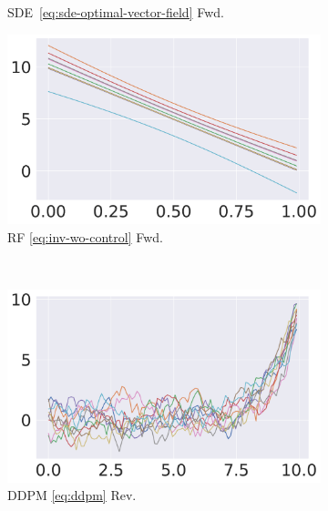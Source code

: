 \documentclass{article} %
\theoremstyle{plain}
\begin{document}
\begin{figure}[!tbh]
\begin{subfigure}[b]{0.24\columnwidth}
        \caption{SDE~\eqref{eq:sde-optimal-vector-field} Fwd.}
     \end{subfigure}
     \begin{subfigure}[b]{0.24\columnwidth}
         \centering
         \includegraphics[width=\linewidth]{pics/rf-fwd.pdf}
        \caption{RF \eqref{eq:inv-wo-control} Fwd.}
     \end{subfigure}
    \\
     \begin{subfigure}[b]{0.24\columnwidth}
         \centering
         \includegraphics[width=\linewidth]{pics/ddpm-inv.pdf}
        \caption{DDPM \eqref{eq:ddpm} Rev.}
     \end{subfigure}
     \begin{subfigure}[b]{0.24\columnwidth}
         \centering

\end{subfigure}
\end{figure}
\end{document}

